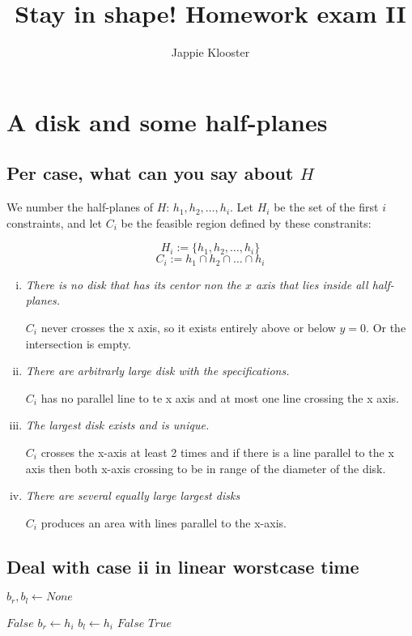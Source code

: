 \documentclass{article}
\begin{document}
\author{Jappie Klooster}
\title{Stay in shape! Homework exam II}
\maketitle
\section{A disk and some half-planes}
\subsection{Per case, what can you say about $H$}
We number the half-planes of $H$: $h_1, h_2,\dots,h_i$.
Let $H_{i}$ be the set of the first $i$ constraints, and
let $C_{i}$ be the feasible region defined by these constranits:

\[ H_i := \{h_1, h_2,\dots, h_i\}\]
\[ C_i := h_1 \cap h_2 \cap \dots \cap h_i\]

\begin{enumerate}[(i)]
	\item \emph{There is no disk that has its centor non the $x$ axis
			that lies inside all half-planes.}

		$C_i$ never crosses the x axis,
		so it exists entirely above or below $y=0$. Or the intersection is empty.

	\item \emph{There are arbitrarly large disk with the specifications.}

		$C_i$ has no parallel line  to te x axis and
		at most one line crossing the x axis.

	\item \emph{The largest disk exists and is unique.}

		$C_i$ crosses the x-axis at least 2 times and
		if there is a line parallel to the x axis then both x-axis crossing
		to be in range of the diameter of the disk.

	\item \emph{There are several equally large largest disks}

		$C_i$ produces an area with lines parallel to the x-axis.

\end{enumerate}

\newpage
\subsection{Deal with case ii in linear worstcase time}
\begin{algorithmic}[1]
		\State
		$b_r, b_l \gets None$

				\State
				\Return $False$
			\EndIf
			\State
			\State
				$b_r \gets h_i$
			\EndIf
			\State
				$b_l \gets h_i$
			\EndIf
				\State
				\Return $False$
			\EndIf
		\EndFor
		\State
		\Return $True$
	\EndFunction
\end{algorithmic}
\end{document}
